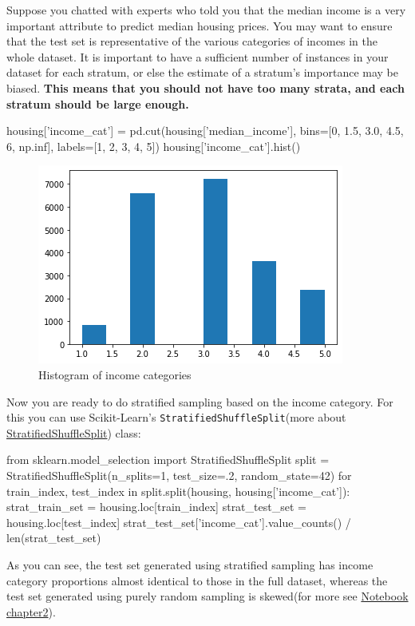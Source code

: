 Suppose you chatted with experts who told you that the median income is a very
important attribute to predict median housing prices. You may want to ensure that
the test set is representative of the various categories of incomes in the whole dataset. It is important to have a sufficient number of instances in your dataset for each stratum, or else the estimate
of a stratum’s importance may be biased. \textbf{This means that you should not have too
many strata, and each stratum should be large enough.}

\begin{pyc}
housing['income_cat'] = pd.cut(housing['median_income'],
                               bins=[0, 1.5, 3.0, 4.5, 6, np.inf], 
                               labels=[1, 2, 3, 4, 5])
housing['income_cat'].hist()
\end{pyc}
\begin{figure}
\centering
\includegraphics{img/codes/Histogram of income categories.png}
\caption{Histogram of income categories}
\label{Histogram of income categories}
\end{figure}
Now you are ready to do stratified sampling based on the income category. For this
you can use Scikit-Learn’s \verb|StratifiedShuffleSplit|(more about \href{https://scikit-learn.org/stable/modules/cross_validation.html}{StratifiedShuffleSplit}) class:

\begin{pyc}
from sklearn.model_selection import StratifiedShuffleSplit
split = StratifiedShuffleSplit(n_splits=1, test_size=.2, random_state=42)
for train_index, test_index in split.split(housing, housing['income_cat']):
    strat_train_set = housing.loc[train_index]
    strat_test_set = housing.loc[test_index]
strat_test_set['income_cat'].value_counts() / len(strat_test_set)
\end{pyc}

 As you can see, the test set generated using stratified sampling has
income category proportions almost identical to those in the full dataset, whereas the
test set generated using purely random sampling is skewed(for more see \href{https://github.com/JPL-JUNO/HOML/blob/main/chapter/chapter2.ipynb}{Notebook chapter2}).

